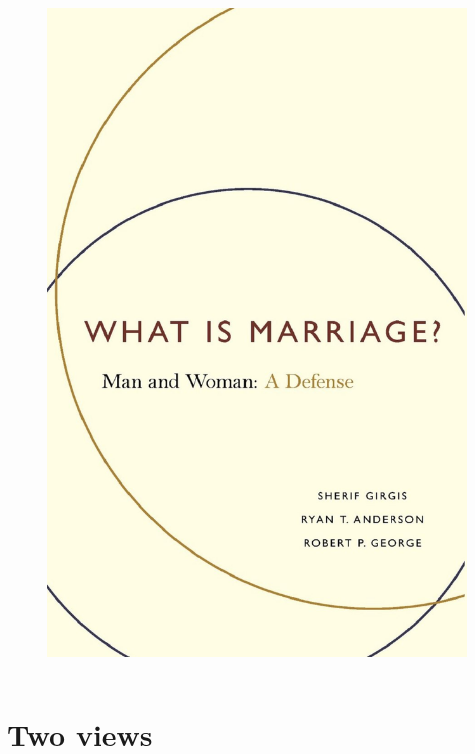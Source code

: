 \documentclass[xcolor=dvipsnames]{beamer}
\begin{document}
\begin{frame}[plain]
  \begin{columns}[T] %
    \begin{column}{0.48\textwidth}
      \begin{figure}[H]
        \centering
        \includegraphics[width=0.99\textwidth]{book}
      \end{figure}
    \end{column}%
  \end{columns}
\end{frame}


\section{Two views}
\end{document}
